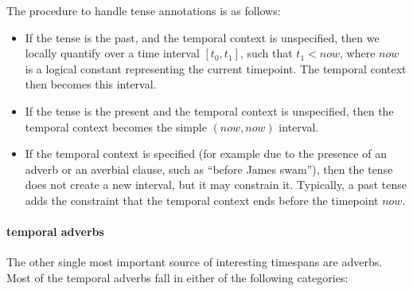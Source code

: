 \documentclass[a4paper,11pt]{article}
\begin{document}
The procedure to handle tense annotations is as follows:
\begin{itemize}
\item If the tense is the past, and the temporal context is
  unspecified, then we locally quantify over a time interval
  $[t_0,t_1]$, such that $t_1 < now$, where $now$ is a logical
  constant representing the current timepoint. The temporal context
  then becomes this interval.
\item If the tense is the present and the temporal context is
  unspecified, then the temporal context becomes the simple
  $(now,now)$ interval.
\item If the temporal context is specified (for example due to the presence of an adverb or an
  averbial clause, such as ``before James swam''), then the tense does
  not create a new interval, but it may constrain it. Typically, a
  past tense adds the constraint that the temporal context ends before
  the timepoint $now$.
\end{itemize}

\paragraph{temporal adverbs}

The other single most important source of interesting timespans are
adverbs. Most of the temporal adverbs fall in either of the following
categories:
\end{document}
